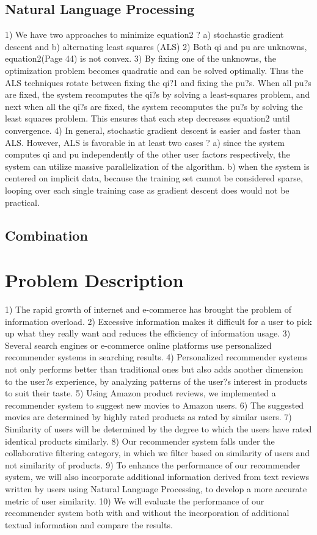 \documentclass{article} %
\begin{document}
\subsection{Natural Language Processing}
1)	We have two approaches to minimize equation2 ? a) stochastic gradient descent and b) alternating least squares (ALS)
2)	Both qi and pu are unknowns, equation2(Page 44) is not convex.
3)	By fixing one of the unknowns, the optimization problem becomes quadratic and can be solved optimally. Thus the ALS techniques rotate between fixing the qi?1 and fixing the pu?s. When all pu?s are fixed, the system recomputes the qi?s by solving a least-squares problem, and next when all the qi?s are fixed, the system recomputes the pu?s by solving the least squares problem. This ensures that each step decreases equation2 until convergence.
4)	In general, stochastic gradient descent is easier and faster than ALS. However, ALS is favorable in at least two cases ? a) since the system computes qi and pu independently of the other user factors respectively, the system can utilize massive parallelization of the algorithm. b) when the system is centered on implicit data, because the training set cannot be considered sparse, looping over each single training case as gradient descent does would not be practical.
\subsection{Combination}


\section{Problem Description}
1)	The rapid growth of internet and e-commerce has brought the problem of information overload.
2)	Excessive information makes it difficult for a user to pick up what they really want and reduces the efficiency of information usage.
3)	Several search engines or e-commerce online platforms use personalized recommender systems in searching results.
4)	Personalized recommender systems not only performs better than traditional ones but also adds another dimension to the user?s experience, by analyzing patterns of the user?s interest in products to suit their taste.
5)	Using Amazon product reviews, we implemented a recommender system to suggest new movies to Amazon users. 
6)	The suggested movies are determined by highly rated products as rated by similar users.
7)	Similarity of users will be determined by the degree to which the users have rated identical products similarly.
8)	Our recommender system falls under the collaborative filtering category, in which we filter based on similarity of users and not similarity of products.
9)	 To enhance the performance of our recommender system, we will also incorporate additional information derived from text reviews written by users using Natural Language Processing, to develop a more accurate metric of user similarity.
10)	We will evaluate the performance of our recommender system both with and without the incorporation of additional textual information and compare the results.
\end{document}
